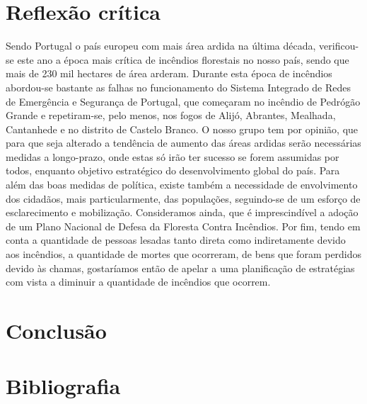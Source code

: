 \documentclass[a4paper,11pt]{report}
\begin{document}
\part{Reflexão crítica}
Sendo Portugal o país europeu com mais área ardida na última década, verificou-se este ano a época mais crítica de incêndios florestais no nosso país, sendo que mais de 230 mil hectares de área arderam.
Durante esta época de incêndios abordou-se bastante as falhas no funcionamento do Sistema Integrado de Redes de Emergência e Segurança de Portugal, que começaram no incêndio de Pedrógão Grande e repetiram-se, pelo menos, nos fogos de Alijó, Abrantes, Mealhada, Cantanhede e no distrito de Castelo Branco.
O nosso grupo tem por opinião, que para que seja alterado a tendência de aumento das áreas ardidas serão necessárias medidas a longo-prazo, onde estas só irão ter sucesso se forem assumidas por todos, enquanto objetivo estratégico do desenvolvimento global do país.
Para além das boas medidas de política, existe também a necessidade de envolvimento dos cidadãos, mais particularmente, das populações, seguindo-se de um esforço de esclarecimento e mobilização.
Consideramos ainda, que é imprescindível a adoção de um Plano Nacional de Defesa da Floresta Contra Incêndios.
Por fim, tendo em conta a quantidade de pessoas lesadas tanto direta como indiretamente devido aos incêndios, a quantidade de mortes que ocorreram, de bens que foram perdidos devido às chamas, gostaríamos então de apelar a uma planificação de estratégias com vista a diminuir a quantidade de incêndios que ocorrem. 





\part{Conclusão}






\part{Bibliografia}
\end{document}
